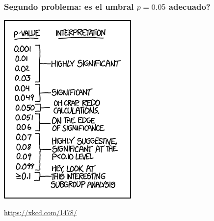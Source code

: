 \documentclass[9pt]{beamer}
\begin{document}
\begin{frame}
  \frametitle{Segundo problema: es el umbral $p = 0.05$ adecuado?}
    \begin{center}
      \includegraphics[height=0.8\textheight]{images/p_values_xkcd}
    \end{center}
    \hfill
    {\scriptsize \href{https://xkcd.com/1478/}{https://xkcd.com/1478/}}
  \end{frame}
\end{document}
